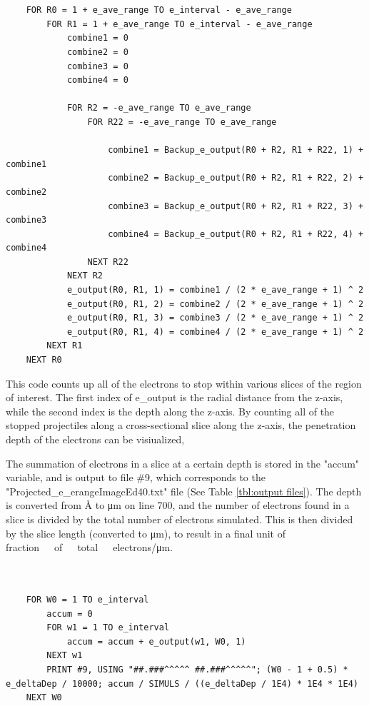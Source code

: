 \documentclass[10pt, reqno]{exam}
\begin{document}
\begin{verbatim}
    
    
    FOR R0 = 1 + e_ave_range TO e_interval - e_ave_range
        FOR R1 = 1 + e_ave_range TO e_interval - e_ave_range
            combine1 = 0
            combine2 = 0
            combine3 = 0
            combine4 = 0
    
            FOR R2 = -e_ave_range TO e_ave_range
                FOR R22 = -e_ave_range TO e_ave_range
    
                    combine1 = Backup_e_output(R0 + R2, R1 + R22, 1) + combine1
                    combine2 = Backup_e_output(R0 + R2, R1 + R22, 2) + combine2
                    combine3 = Backup_e_output(R0 + R2, R1 + R22, 3) + combine3
                    combine4 = Backup_e_output(R0 + R2, R1 + R22, 4) + combine4
                NEXT R22
            NEXT R2
            e_output(R0, R1, 1) = combine1 / (2 * e_ave_range + 1) ^ 2
            e_output(R0, R1, 2) = combine2 / (2 * e_ave_range + 1) ^ 2
            e_output(R0, R1, 3) = combine3 / (2 * e_ave_range + 1) ^ 2
            e_output(R0, R1, 4) = combine4 / (2 * e_ave_range + 1) ^ 2
        NEXT R1
    NEXT R0
\end{verbatim}

\pagebreak

This code counts up all of the electrons to stop within various slices of the region of interest. The first index of e\_output is the radial distance from the z-axis, while the second index is the depth along the z-axis. By counting all of the stopped projectiles along a cross-sectional slice along the z-axis, the penetration depth of the electrons can be visiualized, \par

\vspace{0.5 cm}

The summation of electrons in a slice at a certain depth is stored in the "accum" variable, and is output to file \#9, which corresponds to the "Projected\_e\_erangeImageEd40.txt" file (See Table \ref{tbl:output files}). The depth is converted from \si{\angstrom} to \si{\micro \meter} on line 700, and the number of electrons found in a slice is divided by the total number of electrons simulated. This is then divided by the slice length (converted to \si{\micro\meter}), to result in a final unit of \si{fraction\ of\ total\ electrons/\micro\meter}. 

\begin{verbatim}
    
    
    FOR W0 = 1 TO e_interval
        accum = 0
        FOR w1 = 1 TO e_interval
            accum = accum + e_output(w1, W0, 1)
        NEXT w1
        PRINT #9, USING "##.###^^^^^ ##.###^^^^^"; (W0 - 1 + 0.5) * e_deltaDep / 10000; accum / SIMULS / ((e_deltaDep / 1E4) * 1E4 * 1E4)
    NEXT W0
\end{verbatim}
\end{document}
